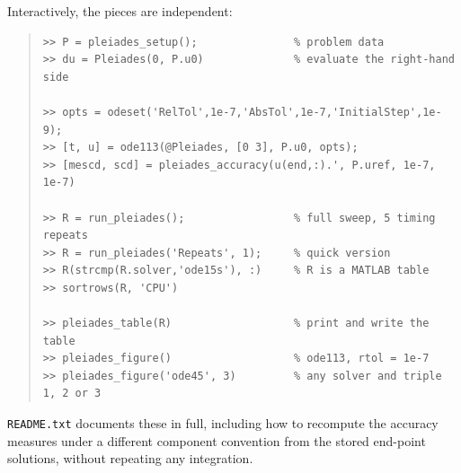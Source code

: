 \documentclass[11pt]{article}
\newcommand{\code}[1]{\texttt{#1}}
\begin{document}
\newpage
Interactively, the pieces are independent:

\begin{quote}
\begin{verbatim}
>> P = pleiades_setup();               % problem data
>> du = Pleiades(0, P.u0)              % evaluate the right-hand side

>> opts = odeset('RelTol',1e-7,'AbsTol',1e-7,'InitialStep',1e-9);
>> [t, u] = ode113(@Pleiades, [0 3], P.u0, opts);
>> [mescd, scd] = pleiades_accuracy(u(end,:).', P.uref, 1e-7, 1e-7)

>> R = run_pleiades();                 % full sweep, 5 timing repeats
>> R = run_pleiades('Repeats', 1);     % quick version
>> R(strcmp(R.solver,'ode15s'), :)     % R is a MATLAB table
>> sortrows(R, 'CPU')

>> pleiades_table(R)                   % print and write the table
>> pleiades_figure()                   % ode113, rtol = 1e-7
>> pleiades_figure('ode45', 3)         % any solver and triple 1, 2 or 3
\end{verbatim}
\end{quote}

\code{README.txt} documents these in full, including how to recompute the accuracy
measures under a different component convention from the stored end-point
solutions, without repeating any integration.



\end{document}
